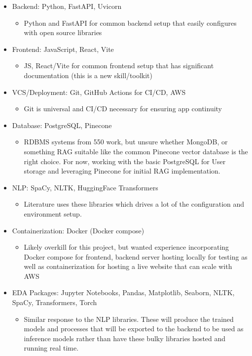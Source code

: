 \documentclass[11pt,letterpaper]{article}
\begin{document}
{

\begin{itemize}
    \item Backend: Python, FastAPI, Uvicorn
    \begin{itemize}
        \item Python and FastAPI for common backend setup that easily configures with open source libraries
    \end{itemize}
    \item Frontend: JavaScript, React, Vite
    \begin{itemize}
        \item JS, React/Vite for common frontend setup that has significant documentation (this is a new skill/toolkit)
    \end{itemize}
    \item VCS/Deployment: Git, GitHub Actions for CI/CD, AWS
    \begin{itemize}
        \item Git is universal and CI/CD necessary for ensuring app continuity
    \end{itemize}
    \item Database: PostgreSQL, Pinecone
    \begin{itemize}
        \item RDBMS systems from 550 work, but unsure whether MongoDB, or something RAG suitable like the common Pinecone vector database is the right choice. For now, working with the basic PostgreSQL for User storage and leveraging Pinecone for initial RAG implementation.
    \end{itemize}
    \item NLP: SpaCy, NLTK, HuggingFace Transformers
    \begin{itemize}
        \item Literature uses these libraries which drives a lot of the configuration and environment setup.
    \end{itemize}
    \item Containerization: Docker (Docker compose)
    \begin{itemize}
        \item Likely overkill for this project, but wanted experience incorporating Docker compose for frontend, backend server hosting locally for testing as well as containerization for hosting a live website that can scale with AWS
    \end{itemize}
    \item EDA Packages: Jupyter Notebooks, Pandas, Matplotlib, Seaborn, NLTK, SpaCy, Transformers, Torch
    \begin{itemize}
        \item Similar response to the NLP libraries. These will produce the trained models and processes that will be exported to the backend to be used as inference models rather than have these bulky libraries hosted and running real time.
    \end{itemize}
\end{itemize}

}
\end{document}
